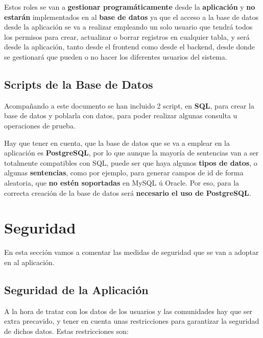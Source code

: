 Estos roles se van a \textbf{gestionar programáticamente} desde la \textbf{aplicación} y \textbf{no estarán} implementados en al\textbf{ base de datos} ya que el acceso a la base de datos desde la aplicación se va a realizar empleando un solo usuario que tendrá todos los permisos para crear, actualizar o borrar registros en cualquier tabla, y será desde la aplicación, tanto desde el frontend como desde el backend, desde donde se gestionará que pueden o no hacer los diferentes usuarios del sistema. 

\subsection{Scripts de la Base de Datos}
Acompañando a este documento se han incluido 2 script, en \textbf{SQL}, para crear la base de datos y poblarla con datos, para poder realizar algunas consulta u operaciones de prueba.

Hay que tener en cuenta, que la base de datos que se va a emplear en la aplicación es \textbf{PostgreSQL}, por lo que aunque la mayoría de sentencias van a ser totalmente compatibles con SQL, puede ser que haya algunos \textbf{tipos de datos}, o algunas \textbf{sentencias}, como por ejemplo, para generar campos de id de forma aleatoria, que \textbf{no estén soportadas} en MySQL ú Oracle. Por eso, para la correcta creación de la base de datos será \textbf{necesario el uso de PostgreSQL}.

\section{Seguridad}
En esta sección vamos a comentar las medidas de seguridad que se van a adoptar en al aplicación.

\subsection{Seguridad de la Aplicación}
A la hora de tratar con los datos de los usuarios y las comunidades hay que ser extra precavido, y tener en cuenta unas restricciones para garantizar la seguridad de dichos datos. Estas restricciones son:

